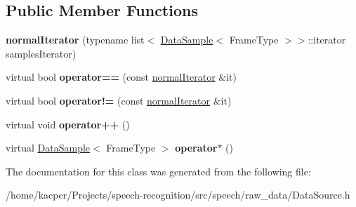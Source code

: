 \subsection*{Public Member Functions}
\begin{DoxyCompactItemize}
\item 
\hypertarget{classspeech_1_1raw__data_1_1DataSource_1_1normalIterator_a1748edb829cff8ee67a5796a0f9b189c}{{\bfseries normal\+Iterator} (typename list$<$ \hyperlink{classspeech_1_1raw__data_1_1DataSample}{Data\+Sample}$<$ Frame\+Type $>$$>$\+::iterator samples\+Iterator)}\label{classspeech_1_1raw__data_1_1DataSource_1_1normalIterator_a1748edb829cff8ee67a5796a0f9b189c}

\item 
\hypertarget{classspeech_1_1raw__data_1_1DataSource_1_1normalIterator_a4fa6120f2a2f58e41800f4132e4086c9}{virtual bool {\bfseries operator==} (const \hyperlink{classspeech_1_1raw__data_1_1DataSource_1_1normalIterator}{normal\+Iterator} \&it)}\label{classspeech_1_1raw__data_1_1DataSource_1_1normalIterator_a4fa6120f2a2f58e41800f4132e4086c9}

\item 
\hypertarget{classspeech_1_1raw__data_1_1DataSource_1_1normalIterator_acf589a04c71c650ab33132771c83f5de}{virtual bool {\bfseries operator!=} (const \hyperlink{classspeech_1_1raw__data_1_1DataSource_1_1normalIterator}{normal\+Iterator} \&it)}\label{classspeech_1_1raw__data_1_1DataSource_1_1normalIterator_acf589a04c71c650ab33132771c83f5de}

\item 
\hypertarget{classspeech_1_1raw__data_1_1DataSource_1_1normalIterator_a34c88d14804e99777ba24284468bb54c}{virtual void {\bfseries operator++} ()}\label{classspeech_1_1raw__data_1_1DataSource_1_1normalIterator_a34c88d14804e99777ba24284468bb54c}

\item 
\hypertarget{classspeech_1_1raw__data_1_1DataSource_1_1normalIterator_a6ec139e8d64ff37cb0995d19dfaff496}{virtual \hyperlink{classspeech_1_1raw__data_1_1DataSample}{Data\+Sample}$<$ Frame\+Type $>$ {\bfseries operator$\ast$} ()}\label{classspeech_1_1raw__data_1_1DataSource_1_1normalIterator_a6ec139e8d64ff37cb0995d19dfaff496}

\end{DoxyCompactItemize}


The documentation for this class was generated from the following file\+:\begin{DoxyCompactItemize}
\item 
/home/kacper/\+Projects/speech-\/recognition/src/speech/raw\+\_\+data/Data\+Source.\+h\end{DoxyCompactItemize}
